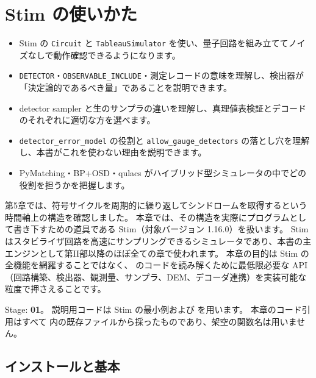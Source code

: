 \chapter{Stim の使いかた}\label{ch:stim}

\begin{chaptergoal}
  \begin{itemize}
  \item Stim の \texttt{Circuit} と \texttt{TableauSimulator} を使い、量子回路を組み立ててノイズなしで動作確認できるようになります。
  \item \texttt{DETECTOR}・\texttt{OBSERVABLE\_INCLUDE}・測定レコードの意味を理解し、検出器が「決定論的であるべき量」であることを説明できます。
  \item detector sampler と生のサンプラの違いを理解し、真理値表検証とデコードのそれぞれに適切な方を選べます。
  \item \texttt{detector\_error\_model} の役割と \texttt{allow\_gauge\_detectors} の落とし穴を理解し、本書がこれを使わない理由を説明できます。
  \item PyMatching・BP+OSD・qulacs がハイブリッド型シミュレータの中でどの役割を担うかを把握します。
  \end{itemize}
\end{chaptergoal}

第5章では、符号サイクルを周期的に繰り返してシンドロームを取得するという時間軸上の構造を確認しました。
本章では、その構造を実際にプログラムとして書き下すための道具である Stim（対象バージョン 1.16.0）を扱います\cite{gidney2021stim, stim2026doc}。
Stim はスタビライザ回路を高速にサンプリングできるシミュレータであり、本書の主エンジンとして第II部以降のほぼ全ての章で使われます。
本章の目的は Stim の全機能を網羅することではなく、 のコードを読み解くために最低限必要な API（回路構築、検出器、観測量、サンプラ、DEM、デコーダ連携）を実装可能な粒度で押さえることです。

\begin{notebox}
  Stage: \textbf{01}。
  説明用コードは Stim の最小例および  を用います。
  本章のコード引用はすべて  内の既存ファイルから採ったものであり、架空の関数名は用いません。
\end{notebox}

\section{インストールと基本}\label{sec:stim_basics}

